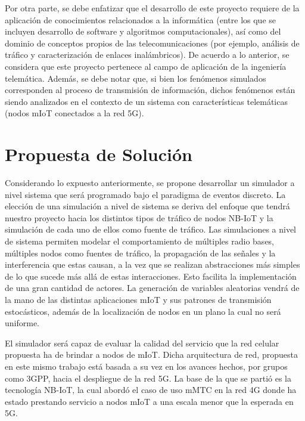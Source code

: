 Por otra parte, se debe enfatizar que el desarrollo de este proyecto requiere de la aplicación de conocimientos relacionados a la informática (entre los que se incluyen desarrollo de software y algoritmos computacionales), así como del dominio de conceptos propios de las telecomunicaciones (por ejemplo, análisis de tráfico y caracterización de enlaces inalámbricos). De acuerdo a lo anterior, se considera que este proyecto pertenece al campo de aplicación de la ingeniería telemática. Además, se debe notar que, si bien los fenómenos simulados corresponden al proceso de transmisión de información, dichos fenómenos están siendo analizados en el contexto de un sistema con características telemáticas (nodos mIoT conectados a la red 5G).\newline

\section{Propuesta de Solución}

Considerando lo expuesto anteriormente, se propone desarrollar un simulador a nivel sistema que será programado bajo el paradigma de eventos discreto. La elección de una simulación a nivel de sistema se deriva del enfoque que tendrá nuestro proyecto hacia los distintos tipos de tráfico de nodos NB-IoT y la simulación de cada uno de ellos como fuente de tráfico. Las simulaciones a nivel de sistema permiten modelar el comportamiento de múltiples radio bases, múltiples nodos como fuentes de tráfico, la propagación de las señales y la interferencia que estas causan, a la vez que se realizan abstracciones más simples de lo que sucede más allá de estas interacciones. Esto facilita la implementación de una gran cantidad de actores. La generación de variables aleatorias vendrá de la mano de las distintas aplicaciones mIoT y sus patrones de transmisión estocásticos, además de la localización de  nodos en un plano la cual no será uniforme.\newline

El simulador será capaz de evaluar la calidad del servicio que la red celular propuesta ha de brindar a nodos de mIoT. Dicha arquitectura de red, propuesta en este mismo trabajo está basada a su vez en los avances hechos, por grupos como 3GPP, hacia el despliegue de la red 5G. La base de la que se partió es la tecnología NB-IoT, la cual abordó el caso de uso mMTC en la red 4G donde ha estado prestando servicio a nodos mIoT a una escala menor que la esperada en 5G.\newline

